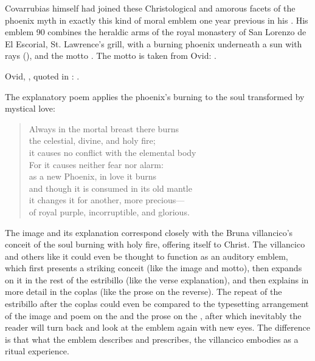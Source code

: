Covarrubias himself had joined these Christological and amorous facets of the
phoenix myth in exactly this kind of moral emblem one year previous in his
.
His emblem 90 combines the heraldic arms of the royal monastery of San Lorenzo
de El Escorial, St. Lawrence's grill, with a burning phoenix underneath a sun
with rays (), and the motto .%
    \Autocite[]{Covarrubias:Emblemas}
The motto is taken from Ovid: .%
\begin{Footnote}
    Ovid, , quoted in
    \autocite[290v]{Covarrubias:Emblemas}: .
\end{Footnote}
The explanatory poem applies the phoenix's burning to the soul transformed by
mystical love:
\begin{quoting}
\begin{verse}
Always in the mortal breast there burns\\
the celestial, divine, and holy fire;\\ 
it causes no conflict with the elemental body\\
For it causes neither fear nor alarm:\\
as a new Phoenix, in love it burns\\
and though it is consumed in its old mantle\\
it changes it for another, more precious---\\
of royal purple, incorruptible, and glorious.
\end{verse}
\end{quoting}
The image and its explanation correspond closely with the Bruna villancico's
conceit of the soul burning with holy fire, offering itself to Christ.
The villancico and others like it could even be thought to function as an
auditory emblem, which first presents a striking conceit (like the image and
motto), then expands on it in the rest of the estribillo (like the verse
explanation), and then explains in more detail in the coplas (like the prose on
the reverse).
The repeat of the estribillo after the coplas could even be compared to the
typesetting arrangement of the image and poem on the  and the prose
on the , after which inevitably the reader will turn back and look
at the emblem again with new eyes.
The difference is that what the emblem describes and prescribes, the villancico
embodies as a ritual experience.


